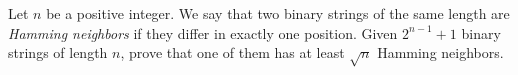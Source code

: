 Let $n$ be a positive integer. We say that two binary strings of the same length are \emph{Hamming neighbors} if they differ in exactly one position. Given $2^{n-1}+1$ binary strings of length $n$, prove that one of them has at least $\sqrt{n}$ Hamming neighbors.